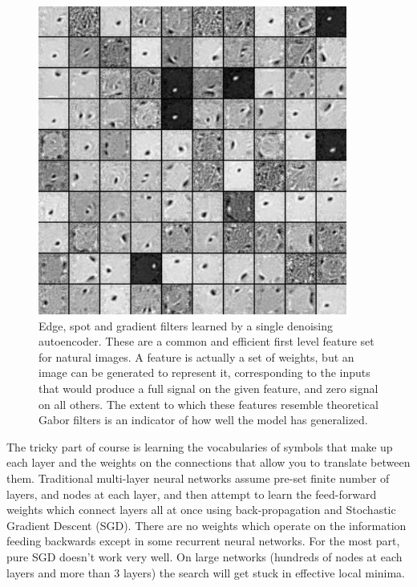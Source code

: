 \documentclass[12pt]{article}
\begin{document}
\begin{doublespacing}
\begin{figure}[p]
\centering
\includegraphics[width=4in,height=4in]{filters_corruption_30}
\caption{Edge, spot and gradient filters learned by a single denoising autoencoder. These are a common and efficient first level feature set for natural images. A feature is actually a set of weights, but an image can be generated to represent it, corresponding to the inputs that would produce a full signal on the given feature, and zero signal on all others. The extent to which these features resemble theoretical Gabor filters is an indicator of how well the model has generalized.}
\label{fig:gaborz}
\end{figure}
	
	The tricky part of course is learning the vocabularies of symbols that make up each layer and the weights on the connections that allow you to translate between them. Traditional multi-layer neural networks assume pre-set finite number of layers, and nodes at each layer, and then attempt to learn the feed-forward weights which connect layers  all at once using back-propagation and Stochastic Gradient Descent (SGD). There are no weights which operate on the information feeding backwards except in some recurrent neural networks. For the most part, pure SGD doesn't work very well. On large networks (hundreds of nodes at each layers and more than 3 layers) the search will get stuck in effective local minima. %
	

\end{doublespacing}
\end{document}
